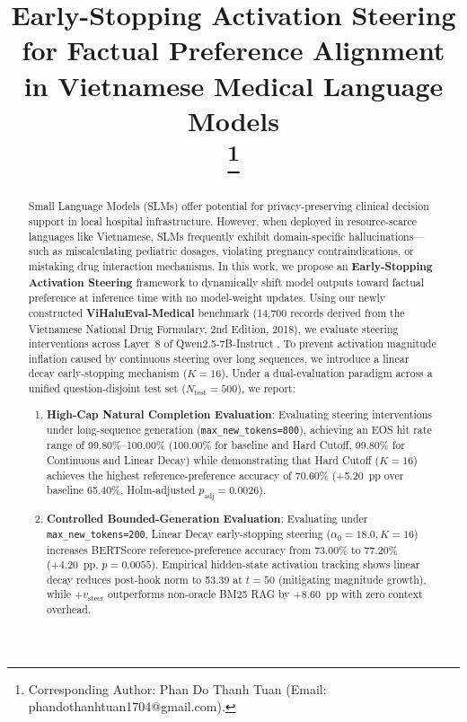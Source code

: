 \documentclass[conference]{IEEEtran}
\begin{document}
\title{Early-Stopping Activation Steering for Factual Preference Alignment in Vietnamese Medical Language Models\\
\thanks{Corresponding Author: Phan Do Thanh Tuan (Email: phandothanhtuan1704@gmail.com).}
}

\author{
}

\maketitle

\begin{abstract}
Small Language Models (SLMs) offer potential for privacy-preserving clinical decision support in local hospital infrastructure. However, when deployed in resource-scarce languages like Vietnamese, SLMs frequently exhibit domain-specific hallucinations---such as miscalculating pediatric dosages, violating pregnancy contraindications, or mistaking drug interaction mechanisms. In this work, we propose an \textbf{Early-Stopping Activation Steering} framework to dynamically shift model outputs toward factual preference at inference time with no model-weight updates. Using our newly constructed \textbf{ViHaluEval-Medical} benchmark (14,700 records derived from the Vietnamese National Drug Formulary, 2nd Edition, 2018), we evaluate steering interventions across Layer~8 of Qwen2.5-7B-Instruct \cite{ref4}. To prevent activation magnitude inflation caused by continuous steering over long sequences, we introduce a linear decay early-stopping mechanism ($K=16$). Under a dual-evaluation paradigm across a unified question-disjoint test set ($N_{\text{test}}=500$), we report:
\begin{enumerate}
    \item \textbf{High-Cap Natural Completion Evaluation}: Evaluating steering interventions under long-sequence generation (\texttt{max\_new\_tokens=800}), achieving an EOS hit rate range of 99.80\%--100.00\% (100.00\% for baseline and Hard Cutoff, 99.80\% for Continuous and Linear Decay) while demonstrating that Hard Cutoff ($K=16$) achieves the highest reference-preference accuracy of 70.60\% (+5.20~pp over baseline 65.40\%, Holm-adjusted $p_{\text{adj}}=0.0026$).
    \item \textbf{Controlled Bounded-Generation Evaluation}: Evaluating under \texttt{max\_new\_tokens=200}, Linear Decay early-stopping steering ($\alpha_0=18.0, K=16$) increases BERTScore reference-preference accuracy from 73.00\% to 77.20\% (+4.20~pp, $p=0.0055$). Empirical hidden-state activation tracking shows linear decay reduces post-hook norm to 53.39 at $t=50$ (mitigating magnitude growth), while $+v_{\text{steer}}$ outperforms non-oracle BM25 RAG by +8.60~pp with zero context overhead.
\end{enumerate}
\end{abstract}
\end{document}
